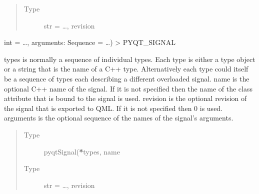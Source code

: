 \documentclass[letterpaper,10pt,english]{sphinxmanual}
\begin{document}
\begin{fulllineitems}
\begin{fulllineitems}
\begin{quote}
\begin{description}
\item[{Type}] \leavevmode
\sphinxAtStartPar
str = …, revision

\end{description}\end{quote}

\end{fulllineitems}


\begin{fulllineitems}
\label{\detokenize{NoSeMazeControl/Windows:Windows.AppWindows.HardwareWindow.save_preferences}}
\pysigstartsignatures
{}
\pysigstopsignatures
\end{fulllineitems}


\begin{fulllineitems}
\label{\detokenize{NoSeMazeControl/Windows:Windows.AppWindows.HardwareWindow.saved}}
\pysigstartsignatures
{}
\pysigstopsignatures
\sphinxAtStartPar
int = …, arguments: Sequence = …) \sphinxhyphen{}\textgreater{} PYQT\_SIGNAL

\sphinxAtStartPar
types is normally a sequence of individual types.  Each type is either a
type object or a string that is the name of a C++ type.  Alternatively
each type could itself be a sequence of types each describing a different
overloaded signal.
name is the optional C++ name of the signal.  If it is not specified then
the name of the class attribute that is bound to the signal is used.
revision is the optional revision of the signal that is exported to QML.
If it is not specified then 0 is used.
arguments is the optional sequence of the names of the signal’s arguments.
\begin{quote}\begin{description}
\item[{Type}] \leavevmode
\sphinxAtStartPar
pyqtSignal({\color{red}\bfseries{}*}types, name

\item[{Type}] \leavevmode
\sphinxAtStartPar
str = …, revision

\end{description}\end{quote}


\end{fulllineitems}
\end{fulllineitems}
\end{document}
